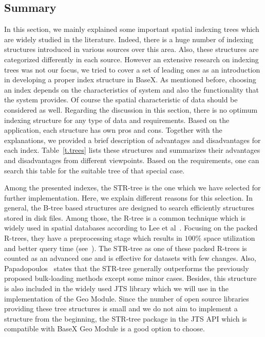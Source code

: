 \documentclass[a4paper,12pt]{article}
\begin{document}
\subsection{Summary}
\label{indexsummary}
In this section, we mainly explained some important spatial indexing trees which are widely studied in the literature. Indeed, there is a huge number of indexing structures introduced in various sources over this area. Also, these structures are categorized differently in each source. However an extensive research on indexing trees was not our focus, we tried to cover a set of leading ones as an introduction in developing a proper index structure in BaseX. As mentioned before, choosing an index depends on the characteristics of system and also the functionality that the system provides. Of course the spatial characteristic of data should be considered as well. 
Regarding the discussion in this section, there is no optimum indexing structure for any type of data and requirements. Based on the application, each structure has own pros and cons. Together with the explanations, we provided a brief description of advantages and disadvantages for each index. %
Table~\ref{t.trees} lists these structures and summarizes their advantages and disadvantages from different viewpoints. 
Based on the requirements, one can search this table for the suitable tree of that special case.

Among the presented indexes, the STR-tree is the one which we have selected for further implementation. 
Here, we explain different reasons for this selection.
In general, the B-tree based structures are designed to search efficiently structures stored in disk files.
Among those, the R-tree is a common technique which is widely used in spatial databases according to Lee et al~\cite{Lee}.
Focusing on the packed R-trees,
they have a preprocessing stage which results in
$100\%$ space utilization and better query time (see~\cite{Lee}).
The STR-tree as one of these packed R-trees is counted as an advanced one 
and is effective for datasets with few changes.
Also, Papadopoulos~\cite{Papadopoulos2010} states that the STR-tree generally outperforms
the previously proposed bulk-loading methods except some minor cases.
Besides, this structure is also included in the widely used JTS library
which we will use in the implementation of the Geo Module.  
Since the number of open source libraries providing these tree structures is small 
and we do not aim to implement a structure from the beginning, 
the STR-tree package in the JTS API which is compatible 
with BaseX Geo Module is a good option to choose.
\end{document}
